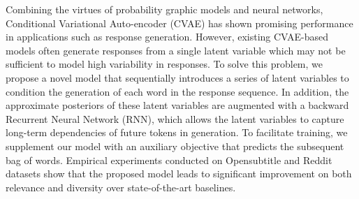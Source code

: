 Combining the virtues of probability graphic models and neural networks, Conditional Variational Auto-encoder (CVAE) has shown promising performance in applications such as response generation. However, existing CVAE-based models often generate responses from a single latent variable which may not be sufficient to model high variability in responses. To solve this problem, we propose a novel model that sequentially introduces a series of latent variables to condition the generation of each word in the response sequence. In addition, the approximate posteriors of these latent variables are augmented with a backward Recurrent Neural Network (RNN), which allows the latent variables to capture long-term dependencies of future tokens in generation. To facilitate training, we supplement our model with an auxiliary objective that predicts the subsequent bag of words. Empirical experiments conducted on Opensubtitle and Reddit datasets show that the proposed model leads to significant improvement on both relevance and diversity over state-of-the-art baselines.
